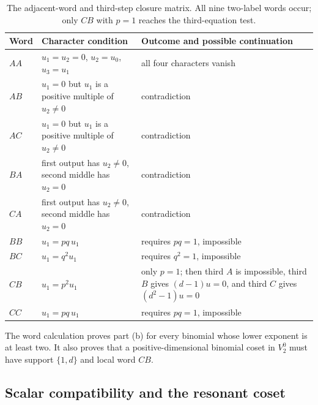 \documentclass[11pt]{article}
\theoremstyle{definition}
\theoremstyle{remark}
\begin{document}
\begin{table}[t]
\centering
\small
\renewcommand{\arraystretch}{1.12}
\begin{tabularx}{\textwidth}{@{}l X X@{}}
\toprule
Word & Character condition & Outcome and possible continuation \\
\midrule
$AA$ & $u_1=u_2=0$, $u_2=u_0$, $u_3=u_1$ & all four characters vanish \\
$AB$ & $u_1=0$ but $u_1$ is a positive multiple of $u_2\neq0$ & contradiction \\
$AC$ & $u_1=0$ but $u_1$ is a positive multiple of $u_2\neq0$ & contradiction \\
$BA$ & first output has $u_2\neq0$, second middle has $u_2=0$ & contradiction \\
$CA$ & first output has $u_2\neq0$, second middle has $u_2=0$ & contradiction \\
$BB$ & $u_1=pq\,u_1$ & requires $pq=1$, impossible \\
$BC$ & $u_1=q^2u_1$ & requires $q^2=1$, impossible \\
$CB$ & $u_1=p^2u_1$ & only $p=1$; then third $A$ is impossible, third $B$ gives $(d-1)u=0$, and third $C$ gives $(d^2-1)u=0$ \\
$CC$ & $u_1=pq\,u_1$ & requires $pq=1$, impossible \\
\bottomrule
\end{tabularx}
\caption{The adjacent-word and third-step closure matrix.  All nine two-label words occur; only $CB$ with $p=1$ reaches the third-equation test.}
\label{tab:words}
\end{table}

The word calculation proves part (b) for every binomial whose lower exponent is at least two.  It also proves that a positive-dimensional binomial coset in $V_2^0$ must have support $\{1,d\}$ and local word $CB$.

\subsection{Scalar compatibility and the resonant coset}
\end{document}
